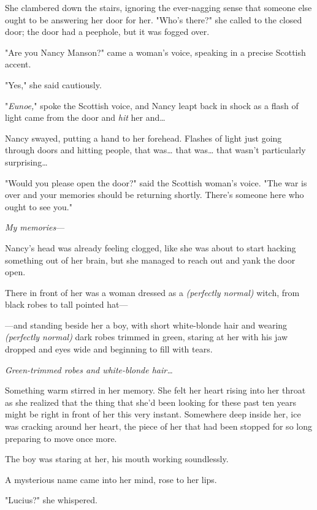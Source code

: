 She clambered down the stairs, ignoring the ever-nagging sense that someone
else ought to be answering her door for her. "Who's there?" she called to the
closed door; the door had a peephole, but it was fogged over.

"Are you Nancy Manson?" came a woman's voice, speaking in a precise Scottish
accent.

"Yes," she said cautiously.

"\emph{Eunoe,}" spoke the Scottish voice, and Nancy leapt back in shock as a
flash of light came from the door and \emph{hit} her and{\ldots}

Nancy swayed, putting a hand to her forehead. Flashes of light just going
through doors and hitting people, that was{\ldots} that was{\ldots} that wasn't
particularly surprising{\ldots}

"Would you please open the door?" said the Scottish woman's voice. "The war is
over and your memories should be returning shortly. There's someone here who
ought to see you."

\emph{My memories}---

Nancy's head was already feeling clogged, like she was about to start hacking
something out of her brain, but she managed to reach out and yank the door open.

There in front of her was a woman dressed as a \emph{(perfectly normal)} witch,
from black robes to tall pointed hat---

---and standing beside her a boy, with short white-blonde hair and wearing
\emph{(perfectly normal)} dark robes trimmed in green, staring at her with his
jaw dropped and eyes wide and beginning to fill with tears.

\emph{Green-trimmed robes and white-blonde hair{\ldots}}

Something warm stirred in her memory. She felt her heart rising into her throat
as she realized that the thing that she'd been looking for these past ten years
might be right in front of her this very instant. Somewhere deep inside her,
ice was cracking around her heart, the piece of her that had been stopped for
so long preparing to move once more.

The boy was staring at her, his mouth working soundlessly.

A mysterious name came into her mind, rose to her lips.

"Lucius?" she whispered.
